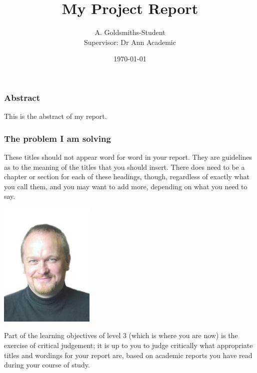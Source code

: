\documentclass{beamer} %
\title{My Project Report}
\author{A. Goldsmiths-Student\\Supervisor: Dr Ann Academic}
\date{\today}                                           %
\begin{document}
\def\newblock{\hskip .11em plus .33em minus .07em}

\maketitle
\def\thepage{\roman{page}}
\begin{frame}
\frametitle{Abstract}
This is the abstract of my report.
\end{frame}
\newpage

\def\thepage{\arabic{page}}
\setcounter{page}{1}

\begin{frame}
\frametitle{The problem I am solving}
These titles should not appear word for word in your report. They are guidelines as to the meaning of the titles that you should insert. There does need to be a chapter or section for each of these headings, though, regardless of exactly what you call them, and you may want to add more, depending on what you need to say.


\includegraphics[height=60mm]{mugshot.jpg}

Part of the learning objectives of level 3 (which is where you are now) is the exercise of critical judgement; it is up to you to judge critically what appropriate titles and wordings for your report are, based on academic reports you have read during your course of study.

\end{frame}
\end{document}
